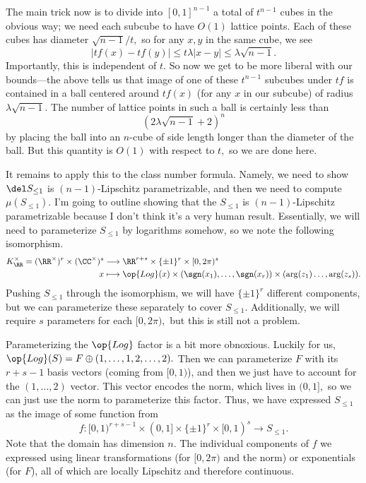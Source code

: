 The main trick now is to divide into $[0,1]^{n-1}$ a total of $t^{n-1}$ cubes in the obvious way; we need each subcube to have $O(1)$ lattice points. Each of these cubes has diameter $\sqrt{n-1}/t,$ so for any $x,y$ in the same cube, we see
\[|tf(x)-tf(y)|\le t\lambda|x-y|\le\lambda\sqrt{n-1}.\]
Importantly, this is independent of $t.$ So now we get to be more liberal with our bounds---the above tells us that image of one of these $t^{n-1}$ subcubes under $tf$ is contained in a ball centered around $tf(x)$ (for any $x$ in our subcube) of radius $\lambda\sqrt{n-1}.$ The number of lattice points in such a ball is certainly less than
\[\left(2\lambda\sqrt{n-1}+2\right)^n\]
by placing the ball into an $n$-cube of side length longer than the diameter of the ball. But this quantity is $O(1)$ with respect to $t,$ so we are done here.

It remains to apply this to the class number formula. Namely, we need to show $\del S_{\le1}$ is $(n-1)$-Lipschitz parametrizable, and then we need to compute $\mu(S_{\le1}).$ I'm going to outline showing that the $S_{\le1}$ is $(n-1)$-Lipschitz parametrizable because I don't think it's a very human result. Essentially, we will need to parameterize $S_{\le1}$ by logarithms somehow, so we note the following isomorphism.
\begin{align*}
    K_\RR^\times=(\RR^\times)^r\times(\CC^\times)^s &\longrightarrow \RR^{r+s}\times\{\pm1\}^r\times[0,2\pi)^s \\
    x &\longmapsto \op{Log}(x) \times (\sgn(x_1),\ldots,\sgn(x_r)) \times (\arg(z_1)\ldots,\arg(z_s)).
\end{align*}
Pushing $S_{\le1}$ through the isomorphism, we will have $\{\pm1\}^r$ different components, but we can parameterize these separately to cover $S_{\le1}.$ Additionally, we will require $s$ parameters for each $[0,2\pi),$ but this is still not a problem.

Parameterizing the $\op{Log}$ factor is a bit more obnoxious. Luckily for us, $\op{Log}(S)=F\oplus(1,\ldots,1,2,\ldots,2).$ Then we can parameterize $F$ with its $r+s-1$  basis vectors (coming from $[0,1)$), and then we just have to account for the $(1,\ldots,2)$ vector. This vector encodes the norm, which lives in $(0,1],$ so we can just use the norm to parameterize this factor. Thus, we have expressed $S_{\le1}$ as the image of some function from
\[f:[0,1)^{r+s-1}\times(0,1]\times\{\pm1\}^r\times[0,1)^s\to S_{\le1}.\]
Note that the domain has dimension $n.$ The individual components of $f$ we expressed using linear transformations (for $[0,2\pi)$ and the norm) or exponentials (for $F$), all of which are locally Lipschitz and therefore continuous.

